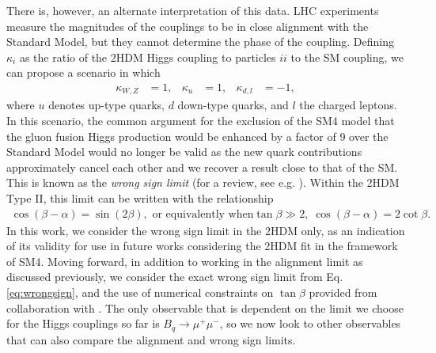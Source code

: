 \documentclass[a4paper,12pt]{article}
\begin{document}
There is, however, an alternate interpretation of this data. 
LHC experiments measure the magnitudes of the couplings to be in close alignment with the Standard Model, but they cannot determine the phase of the coupling. 
Defining $\kappa_i$ as the ratio of the 2HDM Higgs coupling to particles $ii$ to the SM coupling, we can propose a scenario in which 
\begin{align}
    \kappa_{W,Z} &= 1, & \kappa_u &= 1, & \kappa_{d,l} &= -1,
\end{align}
where $u$ denotes up-type quarks, $d$ down-type quarks, and $l$ the charged leptons.
In this scenario, the common argument for the exclusion of the SM4 model that the gluon fusion Higgs production would be enhanced by a factor of 9 over the Standard Model would no longer be valid as the new quark contributions approximately cancel each other and we recover a result close to that of the SM.
This is known as the \emph{wrong sign limit} (for a review, see e.g. \cite{wrong1,wrong2}).
Within the 2HDM Type II, this limit can be written with the relationship
\begin{align}
    \label{eq:wrongsign}
    \cos(\beta-\alpha) = \sin(2\beta), \text{ or equivalently when} \tan\beta\gg2,\; \cos(\beta-\alpha) = 2\cot\beta.
\end{align}
In this work, we consider the wrong sign limit in the 2HDM only, as an indication of its validity for use in future works considering the 2HDM fit in the framework of SM4. 
Moving forward, in addition to working in the alignment limit as discussed previously, we consider the exact wrong sign limit from Eq. \ref{eq:wrongsign}, and the use of numerical constraints on $\tan\beta$ provided from collaboration with \cite{oliver}.
The only observable that is dependent on the limit we choose for the Higgs couplings so far is $B_q\to\mu^+\mu^-$, so we now look to other observables that can also compare the alignment and wrong sign limits.
\end{document}
